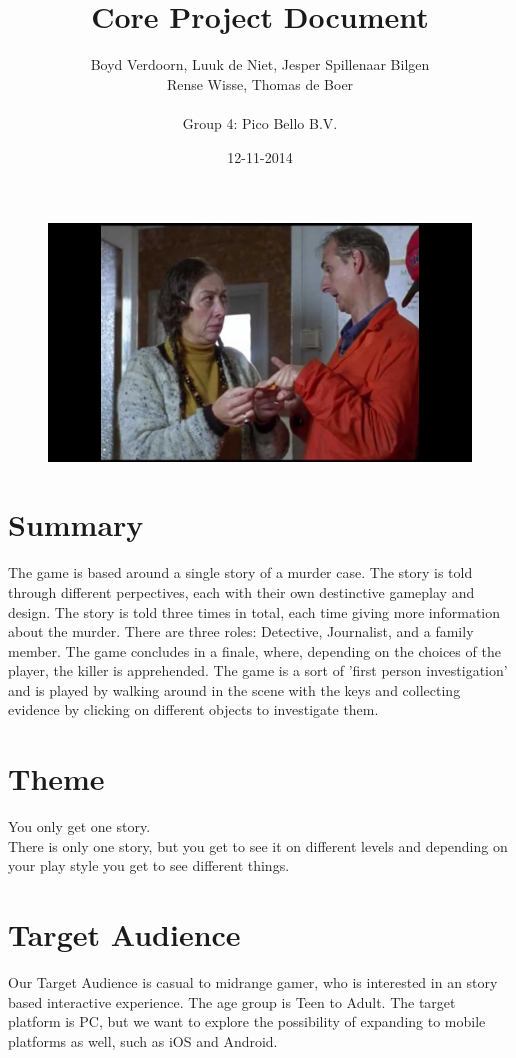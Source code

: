 \documentclass{article}
\title{Core Project Document}
\author{Boyd Verdoorn, Luuk de Niet, Jesper Spillenaar Bilgen\\ Rense Wisse, Thomas de Boer\\ \\Group 4: Pico Bello B.V.}
\date{12-11-2014}
\begin{document}
	\maketitle
	\begin{figure}[ht!]
		\centering
		\includegraphics[width=120mm]{Front.jpg}
	\end{figure}
	\newpage

	\section{Summary}
		The game is based around a single story of a murder case. The story is told through different perpectives, each with their own destinctive gameplay and design. The story is told three times in total, each time giving more information about the murder. There are three roles: Detective, Journalist, and a family member. The game concludes in a finale, where, depending on the choices of the player, the killer is apprehended. The game is a sort of 'first person investigation' and is played by walking around in the scene with the keys and collecting evidence by clicking on different objects to investigate them.

	\section{Theme}
		You only get one story.\\
		There is only one story, but you get to see it on different levels and depending on your play style you get to see different things.

	\section{Target Audience}
		Our Target Audience is casual to midrange gamer, who is interested in an story based interactive experience. The age group is Teen to Adult. The target platform is PC, but we want to explore the possibility of expanding to mobile platforms as well, such as iOS and Android.
\end{document}

